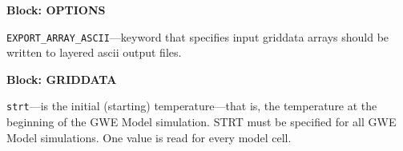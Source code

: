 
\item \textbf{Block: OPTIONS}

\begin{description}
\item \texttt{EXPORT\_ARRAY\_ASCII}---keyword that specifies input griddata arrays should be written to layered ascii output files.

\end{description}
\item \textbf{Block: GRIDDATA}

\begin{description}
\item \texttt{strt}---is the initial (starting) temperature---that is, the temperature at the beginning of the GWE Model simulation.  STRT must be specified for all GWE Model simulations. One value is read for every model cell.

\end{description}

